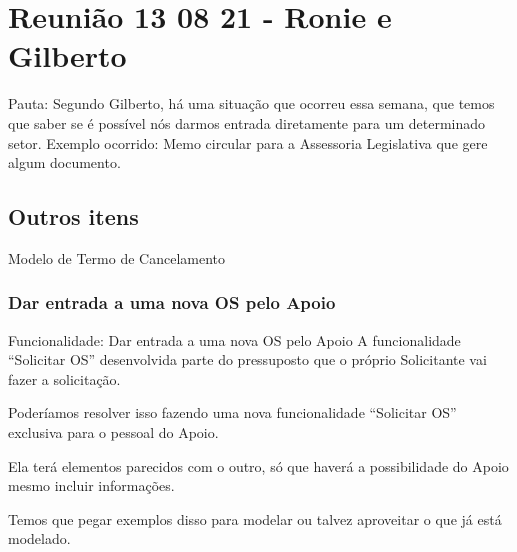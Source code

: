 \section{Reunião 13 08 21 - Ronie e Gilberto}

	Pauta: Segundo Gilberto, há uma situação que ocorreu essa semana, que temos que saber se é possível nós darmos entrada diretamente para um determinado setor. Exemplo ocorrido: Memo circular para a Assessoria Legislativa que gere algum documento.
	
	\subsection{Outros itens}
		
	\mschecknao	\xspace Modelo de Termo de Cancelamento
	
	\subsubsection{Dar entrada a uma nova OS pelo Apoio}
	

		
		
		\begin{funcionalidade}{\hypertarget{r1308-1}{Funcionalidade: Dar entrada a uma nova OS pelo Apoio}}
			A funcionalidade ``Solicitar OS'' desenvolvida parte do pressuposto que o próprio Solicitante vai fazer a solicitação.
	
			Poderíamos resolver isso fazendo uma nova funcionalidade ``Solicitar OS'' exclusiva para o pessoal do Apoio.
			
			Ela terá elementos parecidos com o outro, só que haverá a possibilidade do Apoio mesmo incluir informações.
			
			
			Temos que pegar exemplos disso para modelar ou talvez aproveitar o que já está modelado.
		\end{funcionalidade}

		
